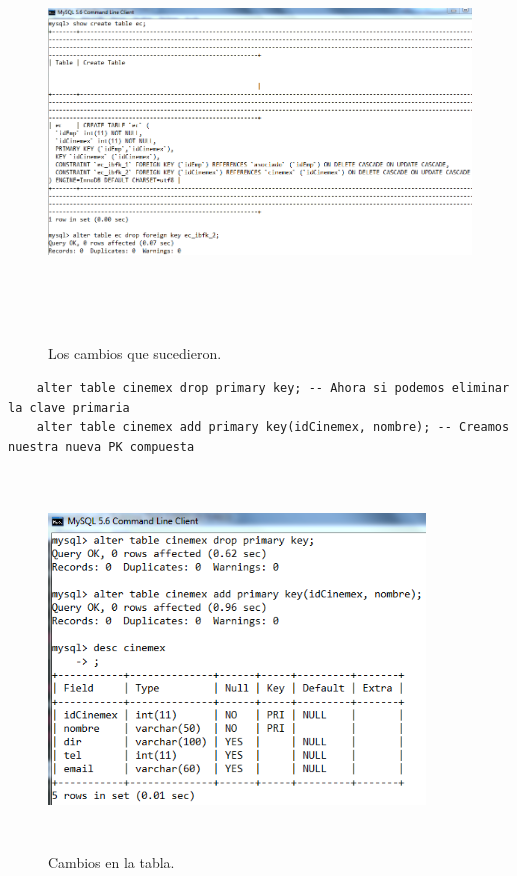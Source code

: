 \documentclass[12pt, titlepage]{article}
\begin{document}
    \begin{figure}[H]
        \begin{center}
            \includegraphics[width=15cm, height=11cm]{img/drop-fk2.png}
            \caption{Los cambios que sucedieron.}
            \label{fig:drop-fk2}
        \end{center}
    \end{figure}
    \begin{lstlisting}
    alter table cinemex drop primary key; -- Ahora si podemos eliminar la clave primaria
    alter table cinemex add primary key(idCinemex, nombre); -- Creamos nuestra nueva PK compuesta
    \end{lstlisting}
    \begin{figure}[H]
        \begin{center}
            \includegraphics[width=10cm, height=10cm]{img/compuesta.png}
            \caption{Cambios en la tabla.}
            \label{fig:tabla}
        \end{center}
    \end{figure}
\end{document}
